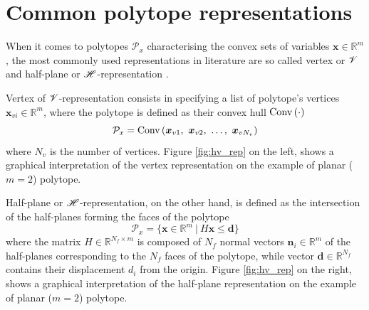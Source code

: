
\section{Common polytope representations}
\label{ch:representations_practical_apps}


When it comes to polytopes $\mathcal{P}_x$ characterising the convex sets of variables $\bm{x}\in\mathbb{R}^m$, the most commonly used representations in literature are so called vertex or $\mathscr{V}$ and half-plane or $\mathscr{H}$-representation \cite{henk2017basic, fukuda2004frequently}. 

Vertex of $\mathscr{V}$-representation consists in specifying a list of polytope's vertices $\bm{x}_{vi}\in\mathbb{R}^m$, where the polytope is defined as their convex hull $\text{Conv}\left(\cdot\right)$
\begin{equation}
\mathcal{P}_x = \text{Conv}\left(\bm{x}_{v1},~\bm{x}_{v2},~ \ldots , ~\bm{x}_{vN_v} \right)
\end{equation} 
where $N_v$ is the number of vertices. Figure \ref{fig:hv_rep} on the left, shows a graphical interpretation of the vertex representation on the example of planar ($m\!=\!2$) polytope. 


Half-plane or $\mathscr{H}$-representation, on the other hand, is defined as the intersection of the half-planes forming the faces of the polytope
\begin{equation}
  \mathcal{P}_x = \{\bm{x} \in \mathbb{R}^m~ |~ H\bm{x} \leq \bm{d} \}
\end{equation} 
where the matrix $H \in \mathbb{R}^{N_f\times m }$ is composed of $N_f$ normal vectors $\bm{n}_i\in\mathbb
{R}^m$ of the half-planes corresponding to the $N_f$ faces of the polytope, while vector $\bm{d}\in \mathbb{R}^{N_f}$ contains their displacement $d_i$ from the origin. Figure \ref{fig:hv_rep} on the right, shows a graphical interpretation of the half-plane representation on the example of planar ($m\!=\!2$) polytope. 

